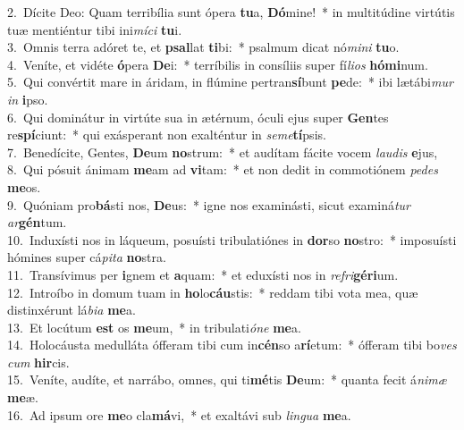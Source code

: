 {2.~}Dícite Deo: Quam terribília sunt ópera \textbf{tu}a, \textbf{Dó}mine!~* in multitúdine virtútis tuæ mentiéntur tibi ini\textit{mí}\textit{ci} \textbf{tu}i.\\
{3.~}Omnis terra adóret te, et \textbf{psal}lat \textbf{ti}bi:~* psalmum dicat nó\textit{mi}\textit{ni} \textbf{tu}o.\\
{4.~}Veníte, et vidéte \textbf{ó}pera \textbf{De}i:~* terríbilis in consíliis super fí\textit{li}\textit{os} \textbf{hó}\textbf{mi}num.\\
{5.~}Qui convértit mare in áridam, in flúmine pertran\textbf{sí}bunt \textbf{pe}de:~* ibi lætábi\textit{mur} \textit{in} \textbf{i}pso.\\
{6.~}Qui dominátur in virtúte sua in ætérnum, óculi ejus super \textbf{Gen}tes re\textbf{spí}ciunt:~* qui exásperant non exalténtur in \textit{se}\textit{me}\textbf{tí}psis.\\
{7.~}Benedícite, Gentes, \textbf{De}um \textbf{no}strum:~* et audítam fácite vocem \textit{lau}\textit{dis} \textbf{e}jus,\\
{8.~}Qui pósuit ánimam \textbf{me}am ad \textbf{vi}tam:~* et non dedit in commotiónem \textit{pe}\textit{des} \textbf{me}os.\\
{9.~}Quóniam pro\textbf{bá}sti nos, \textbf{De}us:~* igne nos examinásti, sicut examiná\textit{tur} \textit{ar}\textbf{gén}tum.\\
{10.~}Induxísti nos in láqueum, posuísti tribulatiónes in \textbf{dor}so \textbf{no}stro:~* imposuísti hómines super cá\textit{pi}\textit{ta} \textbf{no}stra.\\
{11.~}Transívimus per \textbf{i}gnem et \textbf{a}quam:~* et eduxísti nos in \textit{re}\textit{fri}\textbf{gé}\textbf{ri}um.\\
{12.~}Introíbo in domum tuam in \textbf{ho}lo\textbf{cáu}stis:~* reddam tibi vota mea, quæ distinxérunt lá\textit{bi}\textit{a} \textbf{me}a.\\
{13.~}Et locútum \textbf{est} os \textbf{me}um,~* in tribulati\textit{ó}\textit{ne} \textbf{me}a.\\
{14.~}Holocáusta medulláta ófferam tibi cum in\textbf{cén}so a\textbf{rí}etum:~* ófferam tibi bo\textit{ves} \textit{cum} \textbf{hir}cis.\\
{15.~}Veníte, audíte, et narrábo, omnes, qui ti\textbf{mé}tis \textbf{De}um:~* quanta fecit á\textit{ni}\textit{mæ} \textbf{me}æ.\\
{16.~}Ad ipsum ore \textbf{me}o cla\textbf{má}vi,~* et exaltávi sub \textit{lin}\textit{gua} \textbf{me}a.\\
